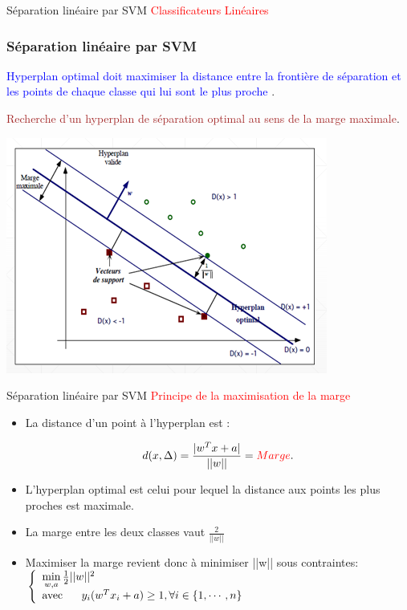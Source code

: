 \documentclass{bredelebeamer}
\begin{document}
\begin{frame}{Séparation linéaire par SVM}
\textcolor{red}{Classificateurs Linéaires}
 
    \frametitle{ Séparation linéaire par SVM}
    \begin{minipage}{0.45\textwidth}
       \textcolor{blue}  {Hyperplan optimal doit maximiser la distance entre la frontière de séparation et les points de chaque classe qui lui sont le plus proche }. \vspace{2\baselineskip}
       
       
  \textcolor{brown} {Recherche d’un hyperplan de séparation optimal au sens de la marge maximale}.
    \end{minipage}
    \begin{minipage}{0.45\textwidth}
        \includegraphics[scale=0.6]{10.png}
    \end{minipage}
\end{frame}

\begin{frame}{Séparation linéaire par SVM}
\textcolor{red}{  Principe de la maximisation de la marge}
\begin{itemize}
         \item  La distance d’un point à l’hyperplan est :
   
       $$d(x,\Delta)=\frac{ |w^{T}x + a|}{||w||} =\textcolor{red} {Marge}  .$$
         \item L’hyperplan optimal est celui pour lequel la distance aux points les plus proches est maximale.
         \item La marge entre les deux classes vaut $\frac{2}{||w||} $
          \item Maximiser la marge revient donc à minimiser ||w|| sous contraintes: \vspace{1\baselineskip} \\
     
$\left\{ \begin{array}{ll}
\min\limits_{w,a} \frac{1}{2} ||w||^2\\ 
\mbox{avec} \hspace{0.6 cm} y_i(w^{T}x_i+a)\geq 1, \forall i \in \{1,\cdots,n\}\\
\end{array}\right.$\\
\end{itemize}
\end{frame}
 
\end{document}
